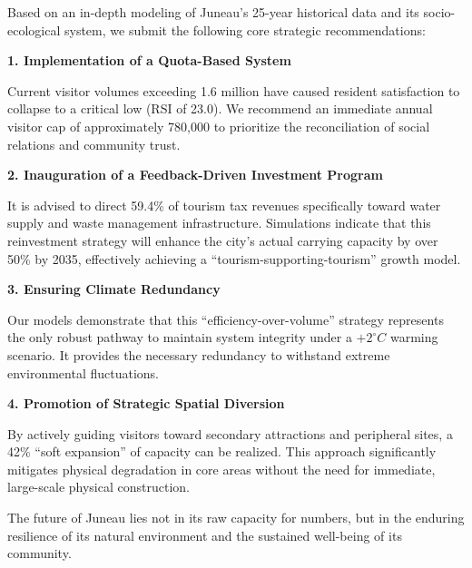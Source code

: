\documentclass{mcmthesis}
\begin{document}
\begin{memo}
\memodate{\today}

\par\noindent Based on an in-depth modeling of Juneau's 25-year historical data and its socio-ecological system, we submit the following core strategic recommendations:

\textbf{1. Implementation of a Quota-Based System}

Current visitor volumes exceeding 1.6 million have caused resident satisfaction to collapse to a critical low (RSI of 23.0). We recommend an immediate annual visitor cap of approximately 780,000 to prioritize the reconciliation of social relations and community trust.

\textbf{2. Inauguration of a Feedback-Driven Investment Program}

It is advised to direct 59.4\% of tourism tax revenues specifically toward water supply and waste management infrastructure. Simulations indicate that this reinvestment strategy will enhance the city's actual carrying capacity by over 50\% by 2035, effectively achieving a ``tourism-supporting-tourism'' growth model.

\textbf{3. Ensuring Climate Redundancy}

Our models demonstrate that this ``efficiency-over-volume'' strategy represents the only robust pathway to maintain system integrity under a $+2^\circ C$ warming scenario. It provides the necessary redundancy to withstand extreme environmental fluctuations.

\textbf{4. Promotion of Strategic Spatial Diversion}

By actively guiding visitors toward secondary attractions and peripheral sites, a 42\% ``soft expansion'' of capacity can be realized. This approach significantly mitigates physical degradation in core areas without the need for immediate, large-scale physical construction.

The future of Juneau lies not in its raw capacity for numbers, but in the enduring resilience of its natural environment and the sustained well-being of its community.

\end{memo}
\end{document}
